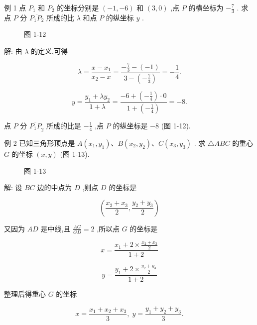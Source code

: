 \documentclass[lang=cn,newtx,10.5pt,scheme=chinese]{elegantbook}
\begin{document}
例 1 点 \({P}_{1}\) 和 \({P}_{2}\) 的坐标分别是 \(\left( {-1, - 6}\right)\) 和 \(\left( {3,0}\right)\) ,点 \(P\) 的横坐标为 \(- \frac{7}{3}\) . 求点 \(P\) 分 \(\overline{{P}_{1}{P}_{2}}\) 所成的比 \(\lambda\) 和点 \(P\) 的纵坐标 \(y\) .

\begin{figure}[h]
	\centering
	
	\caption{图 1-12}
\end{figure}

解: 由 \(\lambda\) 的定义,可得

\[
  \lambda = \frac{x - {x}_{1}}{{x}_{2} - x} = \frac{-\frac{7}{3} - \left( {-1}\right) }{3 - \left( {-\frac{7}{3}}\right) } = - \frac{1}{4}.
\]

\[
  y = \frac{{y}_{1} + \lambda {y}_{2}}{1 + \lambda } = \frac{-6 + \left( {-\frac{1}{4}}\right) \cdot 0}{1 + \left( {-\frac{1}{4}}\right) } = - 8.
\]

点 \(P\) 分 \({\overline{{P}_{1}P}}_{2}\) 所成的比是 \(- \frac{1}{4}\) ,点 \(P\) 的纵坐标是 \(- 8\) (图 1-12).

例 2 已知三角形顶点是 \(A\left( {{x}_{1},{y}_{1}}\right) \text{、}B\left( {{x}_{2},{y}_{2}}\right) \text{、}C\left( {{x}_{3},{y}_{3}}\right)\) . 求 \(\bigtriangleup {ABC}\) 的重心 \(G\) 的坐标 \(\left( {x,y}\right)\) (图 1-13).

\begin{figure}[h]
	\centering
	
	\caption{图 1-13}
\end{figure}

解: 设 \({BC}\) 边的中点为 \(D\) ,则点 \(D\) 的坐标是

\[
  \left( {\frac{{x}_{2} + {x}_{3}}{2},\frac{{y}_{2} + {y}_{3}}{2}}\right)
\]

又因为 \({AD}\) 是中线,且 \(\frac{AG}{GD} = 2\) ,所以点 \(G\) 的坐标是

\[
  x = \frac{{x}_{1} + 2 \times \frac{{x}_{2} + {x}_{3}}{2}}{1 + 2}
\]

\[
  y = \frac{{y}_{1} + 2 \times \frac{{y}_{2} + {y}_{3}}{2}}{1 + 2}
\]

整理后得重心 \(G\) 的坐标

\[
  x = \frac{{x}_{1} + {x}_{2} + {x}_{3}}{3},\;y = \frac{{y}_{1} + {y}_{2} + {y}_{3}}{3}.
\]
\end{document}
